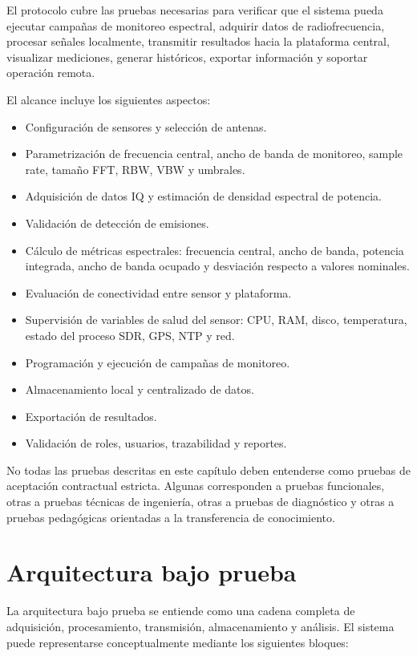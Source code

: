 El protocolo cubre las pruebas necesarias para verificar que el sistema pueda ejecutar campañas de monitoreo espectral, adquirir datos de radiofrecuencia, procesar señales localmente, transmitir resultados hacia la plataforma central, visualizar mediciones, generar históricos, exportar información y soportar operación remota.

El alcance incluye los siguientes aspectos:

\begin{itemize}
    \item Configuración de sensores y selección de antenas.
    \item Parametrización de frecuencia central, ancho de banda de monitoreo, sample rate, tamaño FFT, RBW, VBW y umbrales.
    \item Adquisición de datos IQ y estimación de densidad espectral de potencia.
    \item Validación de detección de emisiones.
    \item Cálculo de métricas espectrales: frecuencia central, ancho de banda, potencia integrada, ancho de banda ocupado y desviación respecto a valores nominales.
    \item Evaluación de conectividad entre sensor y plataforma.
    \item Supervisión de variables de salud del sensor: CPU, RAM, disco, temperatura, estado del proceso SDR, GPS, NTP y red.
    \item Programación y ejecución de campañas de monitoreo.
    \item Almacenamiento local y centralizado de datos.
    \item Exportación de resultados.
    \item Validación de roles, usuarios, trazabilidad y reportes.
\end{itemize}

No todas las pruebas descritas en este capítulo deben entenderse como pruebas de aceptación contractual estricta. Algunas corresponden a pruebas funcionales, otras a pruebas técnicas de ingeniería, otras a pruebas de diagnóstico y otras a pruebas pedagógicas orientadas a la transferencia de conocimiento.

\section{Arquitectura bajo prueba}

La arquitectura bajo prueba se entiende como una cadena completa de adquisición, procesamiento, transmisión, almacenamiento y análisis. El sistema puede representarse conceptualmente mediante los siguientes bloques:

